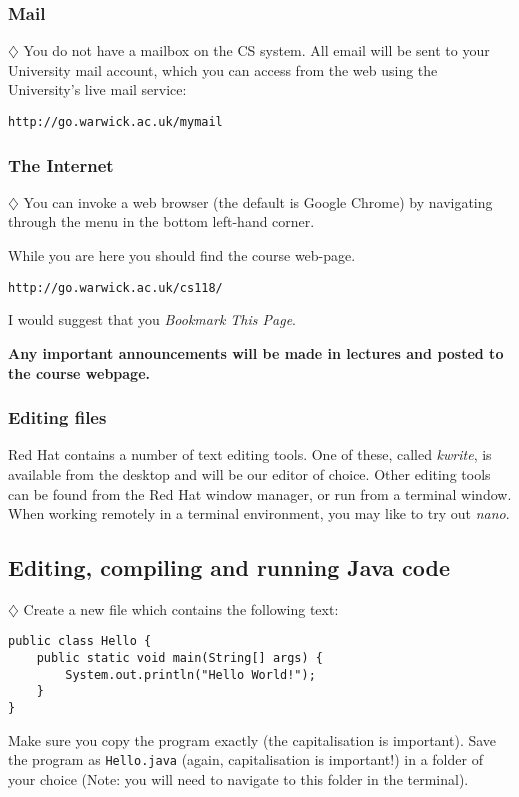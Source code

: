 \subsubsection{Mail}

$\diamondsuit$
You do not have a mailbox on the CS system. All email will be sent to your
University mail account, which you can access from the web using the University's
live mail service: 

{\tt http://go.warwick.ac.uk/mymail}

\subsubsection{The Internet}

$\diamondsuit$
You can invoke a web browser
(the default is Google Chrome) by navigating through the menu in the bottom left-hand corner.

While you are here you should find the course web-page. 

{\tt http://go.warwick.ac.uk/cs118/} 

I would suggest that you {\em Bookmark This Page}.

{\bf Any important announcements will be made in lectures and posted to the course webpage.}

\subsubsection{Editing files}

Red Hat contains a number of text editing tools. One of these, called
{\em kwrite}, is available from the desktop and will be our editor of 
choice. Other editing tools can be found from the Red Hat window manager, or
run from a terminal window. When working remotely in a terminal environment, you
may like to try out {\em nano}.

\subsection{Editing, compiling and running Java code}

$\diamondsuit$ 
Create a new file which contains the following text:

\begin{verbatim}
public class Hello { 
    public static void main(String[] args) {
        System.out.println("Hello World!");
    }
}
\end{verbatim}

Make sure you copy the program exactly (the capitalisation is important). 
Save the program as {\tt Hello.java} (again, capitalisation is important!) 
in a folder of your choice (Note: you
will need to navigate to this folder in the terminal).

